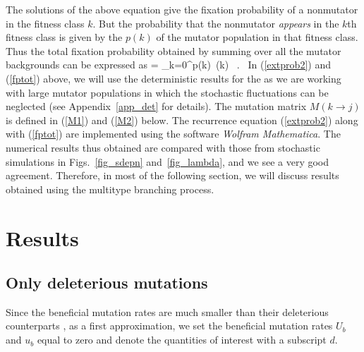\documentclass[preprint,12pt,number]{elsarticle}
\begin{document}
The solutions of the above equation give the fixation probability of a nonmutator in the fitness class $k$. 
But the probability that the nonmutator {\it appears} in the $k$th fitness class is given by the  $p(k)$ of the mutator population in that fitness class. Thus the total fixation probability obtained by summing over all the mutator backgrounds can be expressed as \citep{Johnson:2002}
\be
\label{fptot}
\Pi = \sum_{k=0}^\infty p(k)~\pi(k) ~.~
\ee  
In (\ref{extprob2}) and (\ref{fptot}) above, we will use the deterministic results for the  as we are working with large mutator populations in which the stochastic fluctuations can be neglected (see Appendix~\ref{app_det} for details). The mutation matrix $M(k \to j)$ is defined in (\ref{M1}) and (\ref{M2}) below. 
The recurrence equation (\ref{extprob2}) along with (\ref{fptot}) are implemented using the software \textit{Wolfram Mathematica}. The numerical results thus obtained are compared with those from stochastic simulations in Figs.~\ref{fig_sdepn} and~\ref{fig_lambda}, and we see a very good agreement. Therefore, in most of the following section, we will discuss results obtained using the multitype branching process.  


\section{Results}
\label{results}

\subsection[short]{Only deleterious mutations}
\label{only_del}

Since the beneficial mutation rates are much smaller than their deleterious counterparts \citep{Perfeito:2007}, as a first approximation, we set the beneficial mutation rates $U_b$ and $u_b$ equal to zero and denote the quantities of interest with a subscript $d$. 
\end{document}
